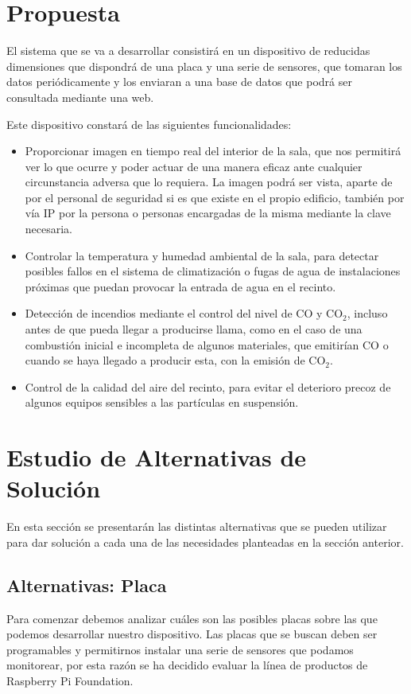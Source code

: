 \section{Propuesta}
El sistema que se va a desarrollar consistirá en un dispositivo de reducidas dimensiones que dispondrá de una placa y una serie de sensores, que tomaran los datos periódicamente y los enviaran a una base de datos que podrá ser consultada mediante una web.

Este dispositivo constará de las siguientes funcionalidades:
\begin{itemize}
	\item Proporcionar imagen en tiempo real del interior de la sala, que nos permitirá ver lo que ocurre y poder actuar de una manera eficaz ante cualquier circunstancia adversa que lo requiera. La imagen podrá ser vista, aparte de por el personal de seguridad si es que existe en el propio edificio, también por vía IP por la persona o personas encargadas de la misma mediante la clave necesaria.
	\item Controlar la temperatura y humedad ambiental de la sala, para detectar posibles fallos en el sistema de climatización o fugas de agua de instalaciones próximas que puedan provocar la entrada de agua en el recinto.
	\item Detección de incendios mediante el control del nivel de CO y CO$_2$, incluso antes de que pueda llegar a producirse llama, como en el caso de una combustión inicial e incompleta de algunos materiales, que emitirían CO o cuando se haya llegado a producir esta, con la emisión de CO$_2$.
	\item Control de la calidad del aire del recinto, para evitar el deterioro precoz de algunos equipos sensibles a las partículas en suspensión.
\end{itemize}

\section{Estudio de Alternativas de Solución}
En esta sección se presentarán las distintas alternativas que se pueden utilizar para dar solución a cada una de las necesidades planteadas en la sección anterior.

\subsection{Alternativas: Placa}
Para comenzar debemos analizar cuáles son las posibles placas sobre las que podemos desarrollar nuestro dispositivo. Las placas que se buscan deben ser programables y permitirnos instalar una serie de sensores que podamos monitorear, por esta razón se ha decidido evaluar la línea de productos de Raspberry Pi Foundation. 


